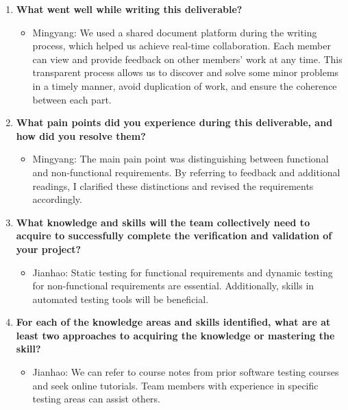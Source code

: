 \documentclass[12pt, titlepage]{article}
\begin{document}
\begin{enumerate}
    \item \textbf{What went well while writing this deliverable?}
    \begin{itemize}
        \item Mingyang: We used a shared document platform during the writing process, which helped us achieve real-time collaboration. Each member can view and provide feedback on other members' work at any time. This transparent process allows us to discover and solve some minor problems in a timely manner, avoid duplication of work, and ensure the coherence between each part.
    \end{itemize}
    
    \item \textbf{What pain points did you experience during this deliverable, and how did you resolve them?}
    \begin{itemize}
        \item Mingyang: The main pain point was distinguishing between functional and non-functional requirements. By referring to feedback and additional readings, I clarified these distinctions and revised the requirements accordingly.
    \end{itemize}
    
    \item \textbf{What knowledge and skills will the team collectively need to acquire to successfully complete the verification and validation of your project?}
    \begin{itemize}
        \item Jianhao: Static testing for functional requirements and dynamic testing for non-functional requirements are essential. Additionally, skills in automated testing tools will be beneficial.
    \end{itemize}

    \item \textbf{For each of the knowledge areas and skills identified, what are at least two approaches to acquiring the knowledge or mastering the skill?}
    \begin{itemize}
        \item Jianhao: We can refer to course notes from prior software testing courses and seek online tutorials. Team members with experience in specific testing areas can assist others.
    \end{itemize}
\end{enumerate}
\end{document}
